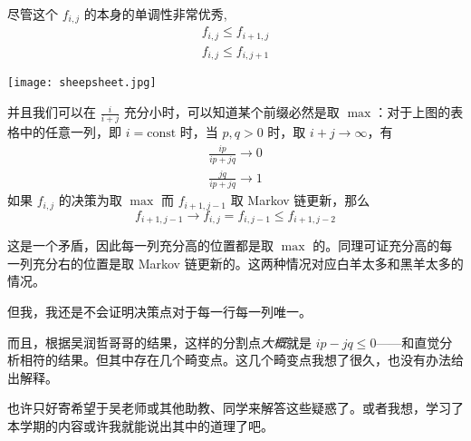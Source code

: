 \documentclass[11pt,a4paper,oneside]{article}
\begin{document}
尽管这个 $f_{i, j}$ 的本身的单调性非常优秀,
\begin{gather*}
    f_{i, j} \leq f_{i + 1, j} \\
    f_{i, j} \leq f_{i, j + 1} 
\end{gather*}
\begin{center}
	\texttt{[image: sheepsheet.jpg]}
\end{center}

并且我们可以在 $\frac i {i + j}$ 充分小时，可以知道某个前缀必然是取 $\max$：对于上图的表格中的任意一列，即 $i = \text{const}$ 时，当 $p, q > 0$ 时，取 $i + j \rightarrow \infty$，有
\begin{gather*}
    \frac {ip} {ip + jq} \rightarrow 0 \\
    \frac {jq} {ip + jq} \rightarrow 1
\end{gather*}
如果 $f_{i, j}$ 的决策为取 $\max$ 而 $f_{i + 1, j - 1}$ 取 Markov 链更新，那么
$$ f_{i + 1, j - 1} \rightarrow f_{i, j} = f_{i, j - 1} \leq f_{i + 1, j - 2}$$

这是一个矛盾，因此每一列充分高的位置都是取 $\max$ 的。同理可证充分高的每一列充分右的位置是取 Markov 链更新的。这两种情况对应白羊太多和黑羊太多的情况。

但我，我还是不会证明决策点对于每一行每一列唯一。

而且，根据吴润哲哥哥的结果，这样的分割点\emph{大概}就是 $ip - jq \leq 0$——和直觉分析相符的结果。但其中存在几个畸变点。这几个畸变点我想了很久，也没有办法给出解释。

也许只好寄希望于吴老师或其他助教、同学来解答这些疑惑了。或者我想，学习了本学期的内容或许我就能说出其中的道理了吧。
\end{document}
